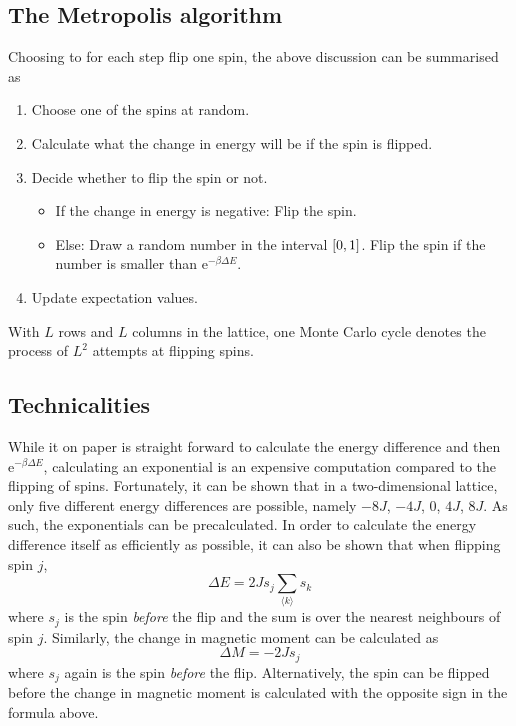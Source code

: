 \documentclass[12pt,english,a4paper]{article}
\renewcommand{\exp}[1]{\mathrm{e}^{#1}}
\begin{document}
\subsection{The Metropolis algorithm}
Choosing to for each step flip one spin, the above discussion can be summarised as
\begin{enumerate}
\item Choose one of the spins at random.
\item Calculate what the change in energy will be if the spin is flipped.
\item Decide whether to flip the spin or not.
\begin{itemize}
\item If the change in energy is negative: Flip the spin.
\item Else: Draw a random number in the interval \(\qty[0,1]\). Flip the spin if the number is smaller than \(\exp{-\beta\Delta E}\).
\end{itemize}
\item Update expectation values.
\end{enumerate}
With \(L\) rows and \(L\) columns in the lattice, one Monte Carlo cycle denotes the process of \(L^2\) attempts at flipping spins.

\subsection{Technicalities}
While it on paper is straight forward to calculate the energy difference and then \(\exp{-\beta \Delta E}\), calculating an exponential is an expensive computation compared to the flipping of spins. Fortunately, it can be shown\autocite{compphys} that in a two-dimensional lattice, only five different energy differences are possible, namely \(-8J\), \(-4J\), \(0\), \(4J\), \(8J\). As such, the exponentials can be precalculated. In order to calculate the energy difference itself as efficiently as possible, it can also be shown that when flipping spin \(j\),
\[
\Delta E = 2Js_j\sum_{\langle k\rangle} s_k
\]
where \(s_j\) is the spin \emph{before} the flip and the sum is over the nearest neighbours of spin \(j\). Similarly, the change in magnetic moment can be calculated as
\[
\Delta M = -2Js_j
\]
where \(s_j\) again is the spin \emph{before} the flip. Alternatively, the spin can be flipped before the change in magnetic moment is calculated with the opposite sign in the formula above.



\end{document}
